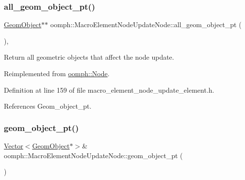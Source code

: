 \subsubsection{\texorpdfstring{all\+\_\+geom\+\_\+object\+\_\+pt()}{all\_geom\_object\_pt()}}
{\footnotesize\ttfamily \hyperlink{classoomph_1_1GeomObject}{Geom\+Object}$\ast$$\ast$ oomph\+::\+Macro\+Element\+Node\+Update\+Node\+::all\+\_\+geom\+\_\+object\+\_\+pt (\begin{DoxyParamCaption}{ }\end{DoxyParamCaption})\hspace{0.3cm}{\ttfamily [inline]}, {\ttfamily [virtual]}}



Return all geometric objects that affect the node update. 



Reimplemented from \hyperlink{classoomph_1_1Node_a2e05b79b6b3249e3ebd9096a550c93b6}{oomph\+::\+Node}.



Definition at line 159 of file macro\+\_\+element\+\_\+node\+\_\+update\+\_\+element.\+h.



References Geom\+\_\+object\+\_\+pt.

\mbox{\label{classoomph_1_1MacroElementNodeUpdateNode_a3874b8d7149e06c48faddd6f3ebee5ce}} 
\subsubsection{\texorpdfstring{geom\+\_\+object\+\_\+pt()}{geom\_object\_pt()}\hspace{0.1cm}{\footnotesize\ttfamily [1/2]}}
{\footnotesize\ttfamily \hyperlink{classoomph_1_1Vector}{Vector}$<$\hyperlink{classoomph_1_1GeomObject}{Geom\+Object}$\ast$$>$\& oomph\+::\+Macro\+Element\+Node\+Update\+Node\+::geom\+\_\+object\+\_\+pt (\begin{DoxyParamCaption}{ }\end{DoxyParamCaption})\hspace{0.3cm}{\ttfamily [inline]}}



